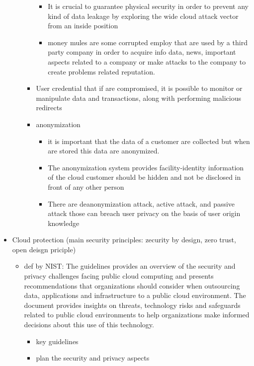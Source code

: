 \documentclass{article}
\begin{document}
\begin{itemize}
\begin{itemize}
\begin{itemize}
\begin{itemize}
                \item It is crucial to guarantee physical security in order to prevent any kind of data leakage by exploring the wide cloud attack vector from an inside position
                \item money mules are some corrupted employ that are used by a third party company in order to acquire info data, news, important aspects related to a company or make attacks to the company to create problems related reputation.
            \end{itemize}
            \item User credential that if are compromised, it is possible to monitor or manipulate data and transactions, along with performing malicious redirects
            \item anonymization
            \begin{itemize}
                \item it is important that the data of a customer are collected but when are stored this data are anonymized.
                \item The anonymization system provides facility-identity information of the cloud customer should be hidden and not be disclosed in front of any other person
                \item There are deanonymization attack, active attack, and passive attack those can breach user privacy on the basis of user origin knowledge
            \end{itemize}
        \end{itemize}
    \end{itemize}
    \item Cloud protection (main security principles: zecurity by design, zero trust, open deisgn priciple)
    \begin{itemize}
        \item def by NIST: The guidelines provides an overview of the security and privacy challenges facing public cloud computing and presents recommendations that organizations should consider when outsourcing data, applications and infrastructure to a public cloud environment. The document provides insights on threats, technology risks and safeguards related to public cloud environments to help organizations make informed decisions about this use of this technology. 
        \begin{itemize}
            \item key guidelines
            \item plan the security and privacy aspects

\end{itemize}
\end{itemize}
\end{itemize}
\end{document}
